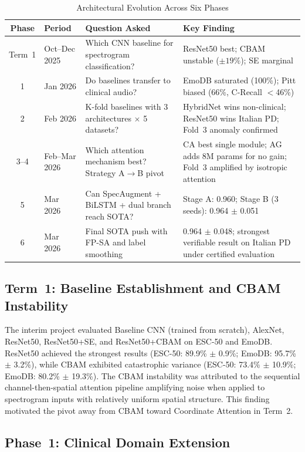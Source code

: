\documentclass[oneside,openany]{final_report}
\begin{document}
\begin{table}[H]
\centering
\caption{Architectural Evolution Across Six Phases}
\label{tab:phases}
\small
\begin{tabularx}{\textwidth}{c l X X}
\toprule
\textbf{Phase} & \textbf{Period} & \textbf{Question Asked} & \textbf{Key Finding} \\
\midrule
Term~1 & Oct--Dec 2025 & Which CNN baseline for spectrogram classification? & ResNet50 best; CBAM unstable ($\pm 19\%$); SE marginal \\
1 & Jan 2026 & Do baselines transfer to clinical audio? & EmoDB saturated (100\%); Pitt biased (66\%, C-Recall $<$46\%) \\
2 & Feb 2026 & K-fold baselines with 3 architectures $\times$ 5 datasets? & HybridNet wins non-clinical; ResNet50 wins Italian PD; Fold~3 anomaly confirmed \\
3--4 & Feb--Mar 2026 & Which attention mechanism best? Strategy A$\to$B pivot & CA best single module; AG adds 8M params for no gain; Fold~3 amplified by isotropic attention \\
5 & Mar 2026 & Can SpecAugment + BiLSTM + dual branch reach SOTA? & Stage A: 0.960; Stage B (3 seeds): 0.964 $\pm$ 0.051 \\
6 & Mar 2026 & Final SOTA push with FP-SA and label smoothing & 0.964 $\pm$ 0.048; strongest verifiable result on Italian PD under certified evaluation \\
\bottomrule
\end{tabularx}
\end{table}

\subsection{Term~1: Baseline Establishment and CBAM Instability}

The interim project evaluated Baseline CNN (trained from scratch), AlexNet, ResNet50, ResNet50+SE, and ResNet50+CBAM on ESC-50 and EmoDB. ResNet50 achieved the strongest results (ESC-50: 89.9\% $\pm$ 0.9\%; EmoDB: 95.7\% $\pm$ 3.2\%), while CBAM exhibited catastrophic variance (ESC-50: 73.4\% $\pm$ 10.9\%; EmoDB: 80.2\% $\pm$ 19.3\%). The CBAM instability was attributed to the sequential channel-then-spatial attention pipeline amplifying noise when applied to spectrogram inputs with relatively uniform spatial structure. This finding motivated the pivot away from CBAM toward Coordinate Attention in Term~2.

\subsection{Phase~1: Clinical Domain Extension}
\end{document}
